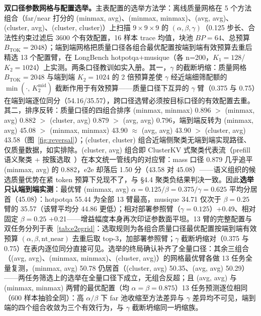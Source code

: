 \documentclass[11pt]{article}
\begin{document}
\textbf{双口径参数网格与配置选举。}主表配置的选举方法学：离线质量网格在 5 个方法组合（far/near 打分的 (minmax, avg)、(minmax, minmax)、(avg, avg)、(cluster, avg)、(cluster, cluster)）上扫描 $9\times9\times9$ 的 $(\alpha,\beta,\gamma)$（0.125 步长、合法性约束过滤后 3600 个有效配置，16 样本 trace 均值，块池 $BP{=}64$、总预算 $B_{\mathrm{TOK}}{=}2048$）；端到端网格把质量口径各组合最优配置按端到端有效预算去重后精选 13 个配置臂，在 LongBench hotpotqa+musique（各 n=200，$K_1{=}128$/$K_2{=}1024$）上实测。两条口径教训如实入册。其一，$\gamma$ 的截断坍缩：质量网格 $B_{\mathrm{TOK}}{=}2048$ 与端到端 $K_2{=}1024$ 的 2 倍预算差使 $\gamma$ 经近端细筛配额的 $\min(\cdot,\,K_2^{\mathrm{mid}})$ 截断作用于有效预算——质量口径下互异的 $\gamma$ 臂（0.375 与 0.75）在端到端逐位同分（54.16/35.57），跨口径选臂必须按目标口径的有效配置去重。其二，排序反转：质量口径的四组合排序 (minmax, minmax) 0.896 $>$ (minmax, avg) 0.882 $>$ (cluster, avg) 0.879 $>$ (avg, avg) 0.796，端到端反转为 (minmax, avg) 45.08 $>$ (minmax, minmax) 43.90 $\approx$ (avg, avg) 43.90 $>$ (cluster, avg) 43.58（图~\ref{fig:reversal}）；(cluster, cluster) 组合近端侧聚类无端到端实现路径、仅质量数据，如实排除。(cluster, avg) 组合即 ClusterKV 式聚类代表流（prefill 语义聚类 + 按簇选取~\cite{clusterkv}）在本文统一管线内的对应臂：mass 口径 0.879 几乎追平 (minmax, avg) 的 0.882，e2e 却落后 1.50 分（43.58 对 45.08）——语义组织的候选质量优势在紧 token 预算下兑现不了，与 \S4.4 聚类负结果判决一致。因此\textbf{选举只认端到端实测}：最优臂 (minmax, avg) $\alpha{=}0.125/\beta{=}0.375/\gamma{=}0.625$ 平均分居首（45.08）：hotpotqa 55.44 为全部 13 臂最高，musique 34.71 仅次于 $\beta{=}0.25$ 臂的 35.57（该臂平均分 44.86 更低）；相对部署参照臂（$\gamma{=}0.125$）+0.49、相对固定 $\beta{=}0.25$ +0.21——增益幅度本身再次印证参数面平坦。13 臂的完整配置与双任务分列于表~\ref{tab:e2egrid}：选取规则为各组合质量口径最优配置按端到端有效预算 $(\alpha,\beta,\mathrm{nt\_near})$ 去重后取 top-3，加部署参照臂；$\gamma$ 截断坍缩对（0.375 与 0.75）在表内逐位同分直接可见。选举的终局确认补齐了全量口径：其余三组合（(avg, avg)、(minmax, minmax)、(cluster, avg)）的网格最优臂各做 13 任务全量复测，(minmax, avg) 50.78 仍居首（(cluster, avg) 50.35、(avg, avg) 50.29）——两任务筛选上的选举在全量口径下成立，无组合反超；且 (avg, avg) 与 (minmax, minmax) 两臂的最优配置（均 $\alpha{=}\beta{=}0.875$）13 任务预测逐位相同（600 样本抽验全同）：高 $\alpha/\beta$ 下 far 池收缩至方法差异与 $\gamma$ 差异均不可见，端到端的四个组合收敛为三个有效行为，与 $\gamma$ 截断坍缩同一坍缩族。
\end{document}
